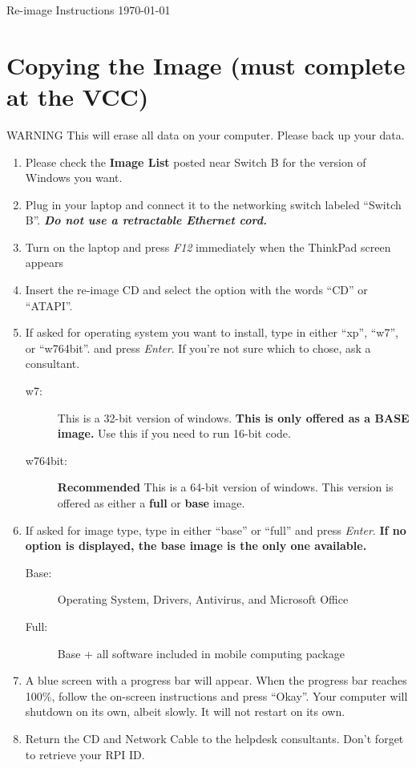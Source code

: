 \documentclass[10pt]{article}
\begin{document}
\begin{flushright}
Re-image Instructions \today
\end{flushright}
\section{Copying the Image (must complete at the VCC)}
{\sc WARNING This will erase all data on your computer. Please back up your data.}
\begin{enumerate}
\item Please check the {\bf Image List} posted near Switch B for the version of Windows you want.
\item Plug in your laptop and connect it to the networking switch labeled ``Switch B''. \emph{\bf Do not use a retractable Ethernet cord.}
\item Turn on the laptop and press \emph{F12} immediately when the ThinkPad screen appears
\item Insert the re-image CD and select the option with the words ``CD'' or ``ATAPI''.
\item If asked for operating system you want to install, type in either ``xp'', ``w7'', or ``w764bit''. and press \emph{Enter}. If you're not sure which to chose, ask a consultant.
\begin{description}
\item[w7:] This is a 32-bit version of windows. {\bf This is only offered as a BASE image.} Use this if you need to run 16-bit code.
\item[w764bit:] {\bf Recommended} This is a 64-bit version of windows. This version is offered as either a {\bf full} or {\bf base} image.
\end{description}
\item If asked for image type, type in either ``base'' or ``full'' and press \emph{Enter}. {\bf If no option is displayed, the base image is the only one available.}
\begin{description}
\item[Base:] Operating System, Drivers, Antivirus, and Microsoft Office
\item[Full:] Base + all software included in mobile computing package
\end{description}
\item A blue screen with a progress bar will appear. When the progress bar reaches 100\%, follow the on-screen instructions and press ``Okay''. Your computer will shutdown on its own, albeit slowly. It will not restart on its own.
\item Return the CD and Network Cable to the helpdesk consultants. Don't forget to retrieve your RPI ID.

\end{enumerate}
\end{document}
